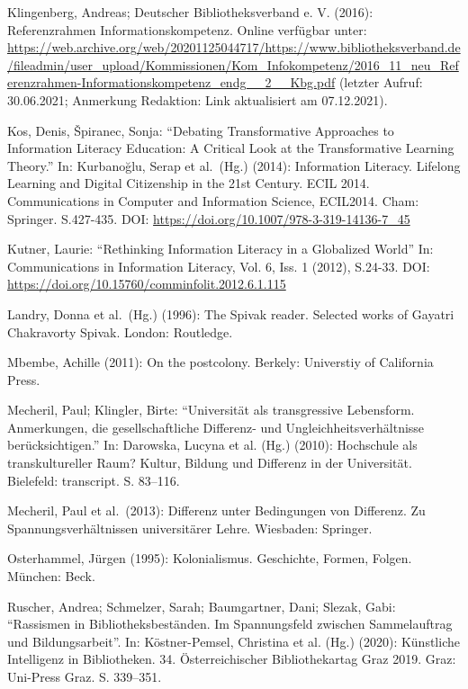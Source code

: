 \documentclass[a4paper,
fontsize=11pt,
oneside,
numbers=noperiodatend,
parskip=half-,
bibliography=totoc,
final
]{scrartcl}
\begin{document}
Klingenberg, Andreas; Deutscher Bibliotheksverband e. V. (2016):
Referenzrahmen Informationskompetenz. Online verfügbar unter:
\href{https://web.archive.org/web/20201125044717/https://www.bibliotheksverband.de/fileadmin/user_upload/Kommissionen/Kom_Infokompetenz/2016_11_neu_Referenzrahmen-Informationskompetenz_endg__2__Kbg.pdf}{https://web.archive.org/web/20201125044717/\linebreak\-https://www.bibliotheksverband.de/fileadmin/user\_upload/Kommissionen/Kom\_Info\linebreak\-kompetenz/2016\_11\_neu\_Referenzrahmen-Informationskompetenz\_endg\_\_2\_\_Kbg.pdf}
(letzter Aufruf: 30.06.2021; Anmerkung Redaktion: Link aktualisiert am
07.12.2021).

Kos, Denis, Špiranec, Sonja: \enquote{Debating Transformative Approaches
to Information Literacy Education: A Critical Look at the Transformative
Learning Theory.} In: Kurbanoğlu, Serap et al.~(Hg.) (2014): Information
Literacy. Lifelong Learning and Digital Citizenship in the 21st Century.
ECIL 2014. Communications in Computer and Information Science, ECIL2014.
Cham: Springer. S.427-435. DOI:
\url{https://doi.org/10.1007/978-3-319-14136-7_45}

Kutner, Laurie: \enquote{Rethinking Information Literacy in a Globalized
World} In: Communications in Information Literacy, Vol. 6, Iss. 1
(2012), S.24-33. DOI:
\url{https://doi.org/10.15760/comminfolit.2012.6.1.115}

Landry, Donna et al.~(Hg.) (1996): The Spivak reader. Selected works of
Gayatri Chakravorty Spivak. London: Routledge.

Mbembe, Achille (2011): On the postcolony. Berkely: Universtiy of
California Press.

Mecheril, Paul; Klingler, Birte: \enquote{Universität als transgressive
Lebensform. Anmerkungen, die gesellschaftliche Differenz- und
Ungleichheitsverhältnisse berücksichtigen.} In: Darowska, Lucyna et al.
(Hg.) (2010): Hochschule als transkultureller Raum? Kultur, Bildung und
Differenz in der Universität. Bielefeld: transcript. S. 83--116.

Mecheril, Paul et al.~(2013): Differenz unter Bedingungen von Differenz.
Zu Spannungsverhältnissen universitärer Lehre. Wiesbaden: Springer.

Osterhammel, Jürgen (1995): Kolonialismus. Geschichte, Formen, Folgen.
München: Beck.

Ruscher, Andrea; Schmelzer, Sarah; Baumgartner, Dani; Slezak, Gabi:
\enquote{Rassismen in Bibliotheksbeständen. Im Spannungsfeld zwischen
Sammelauftrag und Bildungsarbeit}. In: Köstner-Pemsel, Christina et al.
(Hg.) (2020): Künstliche Intelligenz in Bibliotheken. 34.
Österreichischer Bibliothekartag Graz 2019. Graz: Uni-Press Graz. S.
339--351.
\end{document}
